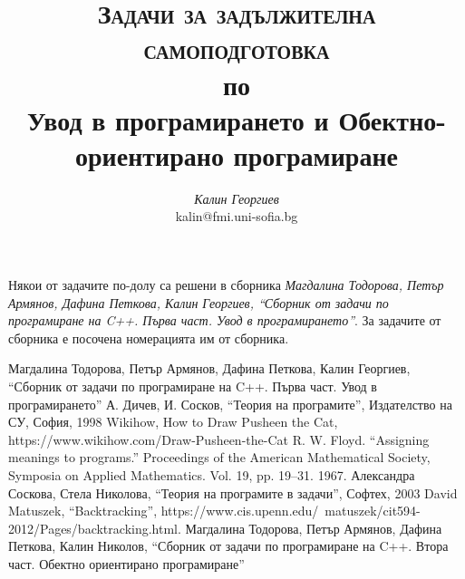 \documentclass[12pt,a4paper]{article}
\author{\textit{Калин Георгиев}\\
\small{kalin@fmi.uni-sofia.bg}}
\title{\textsc{Задачи за задължителна самоподготовка} \\
по \\
Увод в програмирането и Обектно-ориентирано програмиране}
\begin{document}
\maketitle

\tableofcontents

\pagebreak

\small{Някои от задачите по-долу са решени в сборника \cite{sbornik}\textit{Магдалина Тодорова, Петър Армянов, Дафина Петкова, Калин Георгиев, ``Сборник от задачи по програмиране на C++. Първа част. Увод в програмирането''}. За задачите от сборника е посочена номерацията им от сборника.}

\pagebreak



\pagebreak 



\pagebreak 



\pagebreak


\begin{thebibliography}{99}

	Магдалина Тодорова, Петър Армянов, Дафина Петкова, Калин Георгиев, ``Сборник от задачи по програмиране на C++. Първа част. Увод в програмирането''
 А. Дичев, И. Сосков, ``Теория на програмите'', Издателство на СУ, София, 1998
 Wikihow, How to Draw Pusheen the Cat, https://www.wikihow.com/Draw-Pusheen-the-Cat
 R. W. Floyd. ``Assigning meanings to programs.'' Proceedings of the American Mathematical Society, Symposia on Applied Mathematics. Vol. 19, pp. 19–31. 1967.
	Александра Соскова, Стела Николова, ``Теория на програмите в задачи'', Софтех, 2003
	David Matuszek, ``Backtracking'', https://www.cis.upenn.edu/~matuszek/cit594-2012/Pages/backtracking.html.
 Магдалина Тодорова, Петър Армянов, Дафина Петкова, Калин Николов, ``Сборник от задачи по програмиране на C++. Втора част. Обектно ориентирано програмиране''


\end{thebibliography}
\end{document}
